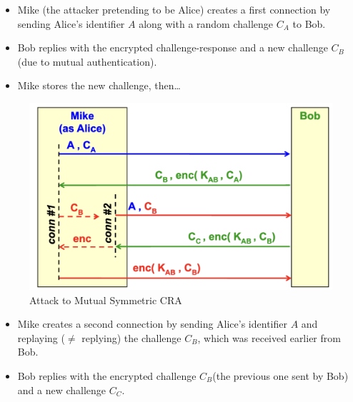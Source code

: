 \begin{multicols}{2}

    \begin{itemize}
        \item Mike (the attacker pretending to be Alice) creates a first connection by sending Alice's identifier $A$ along with a random challenge $C_A$ to Bob.
        \item Bob replies with the encrypted challenge-response and a new challenge $C_B$ (due to mutual authentication).
        \item Mike stores the new challenge, then\dots
    \end{itemize}
    \columnbreak

    \begin{figure}[H]
        \centering
        \includegraphics[width=\linewidth]{Images/Authentication/msCRAatt.png}
        \caption{Attack to Mutual Symmetric CRA}
    \end{figure}
\end{multicols}
\begin{itemize}
    \item Mike creates a second connection by sending Alice's identifier $A$ and replaying ($\ne$ replying) the challenge $C_B$, which was received earlier from Bob.
    \item Bob replies with the encrypted challenge $C_B$(the previous one sent by Bob) and a new challenge $C_C$.
\end{itemize}

